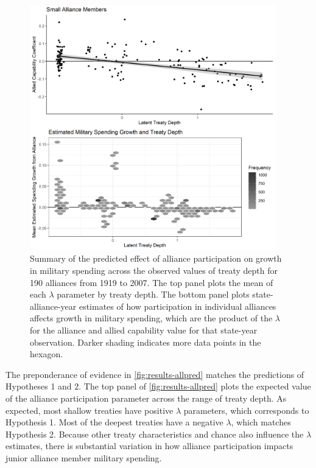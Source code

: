 \documentclass[12pt]{article}
\begin{document}
\begin{figure}[htbp]
	\centering
		\includegraphics[width=0.95\textwidth]{../figures/results-allpred.png}
	\caption{Summary of the predicted effect of alliance participation on growth in military spending across the observed values of treaty depth for 190 alliances from 1919 to 2007. The top panel plots the mean of each $\lambda$ parameter by treaty depth. The bottom panel plots state-alliance-year estimates of how participation in individual alliances affects growth in military spending, which are the product of the $\lambda$ for the alliance and allied capability value for that state-year observation. Darker shading indicates more data points in the hexagon.}
	\label{fig:results-allpred}
\end{figure}


The preponderance of evidence in \autoref{fig:results-allpred} matches the predictions of Hypotheses 1 and 2.
The top panel of \autoref{fig:results-allpred} plots the expected value of the alliance participation parameter across the range of treaty depth. 
As expected, most shallow treaties have positive $\lambda$ parameters, which corresponds to Hypothesis 1. 
Most of the deepest treaties have a negative $\lambda$, which matches Hypothesis 2. 
Because other treaty characteristics and chance also influence the $\lambda$ estimates, there is substantial variation in how alliance participation impacts junior alliance member military spending. 
\end{document}
